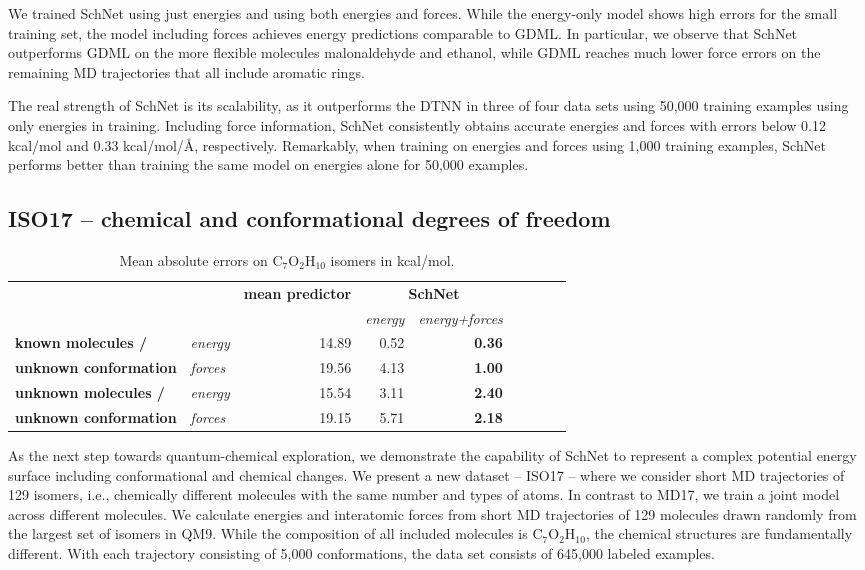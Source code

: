 \documentclass{article}
\begin{document}
We trained SchNet using just energies and using both energies and forces.
While the energy-only model shows high errors for the small training set, the model including forces achieves energy predictions comparable to GDML.
In particular, we observe that SchNet outperforms GDML on the more flexible molecules malonaldehyde and ethanol, while GDML reaches much lower force errors on the remaining MD trajectories that all include aromatic rings.

The real strength of SchNet is its scalability, as it outperforms the DTNN in three of four data sets using 50,000 training examples using only energies in training.
Including force information, SchNet consistently obtains accurate energies and forces with errors below 0.12 kcal/mol and 0.33 kcal/mol/{\AA}, respectively. 
Remarkably, when training on energies and forces using 1,000 training examples, SchNet performs better than training the same model on energies alone for 50,000 examples.

\subsection{ISO17 -- chemical and conformational degrees of freedom}
\begin{table}
\caption{Mean absolute errors on C$_7$O$_2$H$_{10}$ isomers in kcal/mol.}\label{tab:isomer}
\centering
\small
\begin{tabular}{llrrrrrrr}
\toprule
 & & \textbf{mean predictor} & \multicolumn{2}{c}{\textbf{SchNet}} \\
 & &                         & \textit{energy} & \textit{energy+forces} \\ \midrule
\textbf{known molecules /} &   \textit{energy}   & 14.89 & 0.52 & \textbf{0.36}\\
\textbf{unknown conformation} & \textit{forces} & 19.56 & 4.13 & \textbf{1.00} \\ \midrule
\textbf{unknown molecules /} & \textit{energy}   & 15.54 & 3.11 & \textbf{2.40} \\
\textbf{unknown conformation} & \textit{forces} & 19.15 & 5.71 & \textbf{2.18} \\
\bottomrule
\end{tabular}
\end{table}
As the next step towards quantum-chemical exploration, we demonstrate the capability of SchNet to represent a complex potential energy surface including conformational and chemical changes.
We present a new dataset -- ISO17 -- where we consider short MD trajectories of 129 isomers, i.e., chemically different molecules with the same number and types of atoms.
In contrast to MD17, we train a joint model across different molecules.
We calculate energies and interatomic forces from short MD trajectories of 129 molecules drawn randomly from the largest set of isomers in QM9.
While the composition of all included molecules is C$_7$O$_2$H$_{10}$, the chemical structures are fundamentally different.
With each trajectory consisting of 5,000 conformations, the data set consists of 645,000 labeled examples.
\end{document}
